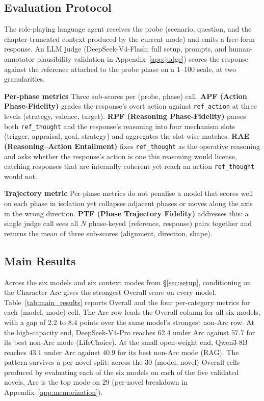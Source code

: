\documentclass[11pt]{article}
\begin{document}
\subsection{Evaluation Protocol\label{sec:evalproto}}

The role-playing language agent receives the probe (scenario, question, and the chapter-truncated context produced by the current mode) and emits a free-form response. An LLM judge (DeepSeek-V4-Flash; full setup, prompts, and human-annotator plausibility validation in Appendix~\ref{app:judge}) scores the response against the reference attached to the probe phase on a $1$--$100$ scale, at two granularities.

\textbf{Per-phase metrics}
Three sub-scores per (probe, phase) call. \textbf{APF (Action Phase-Fidelity)} grades the response's overt action against \texttt{ref\_action} at three levels (strategy, valence, target). \textbf{RPF (Reasoning Phase-Fidelity)} parses both \texttt{ref\_thought} and the response's reasoning into four mechanism slots (trigger, appraisal, goal, strategy) and aggregates the slot-wise matches. \textbf{RAE (Reasoning--Action Entailment)} fixes \texttt{ref\_thought} as the operative reasoning and asks whether the response's action is one this reasoning would license, catching responses that are internally coherent yet reach an action \texttt{ref\_thought} would not.

\textbf{Trajectory metric}
Per-phase metrics do not penalise a model that scores well on each phase in isolation yet collapses adjacent phases or moves along the axis in the wrong direction. \textbf{PTF (Phase Trajectory Fidelity)} addresses this: a single judge call sees all $N$ phase-keyed (reference, response) pairs together and returns the mean of three sub-scores (alignment, direction, shape).

\subsection{Main Results\label{sec:main}}

Across the six models and six context modes from \S\ref{sec:setup}, conditioning on the Character Arc gives the strongest Overall score on every model. Table~\ref{tab:main_results} reports Overall and the four per-category metrics for each (model, mode) cell. The Arc row leads the Overall column for all six models, with a gap of $2.2$ to $8.4$ points over the same model's strongest non-Arc row. At the high-capacity end, DeepSeek-V4-Pro reaches $62.4$ under Arc against $57.7$ for its best non-Arc mode (LifeChoice). At the small open-weight end, Qwen3-8B reaches $43.1$ under Arc against $40.9$ for its best non-Arc mode (RAG). The pattern survives a per-novel split: across the $30$ (model, novel) Overall cells produced by evaluating each of the six models on each of the five validated novels, Arc is the top mode on $29$ (per-novel breakdown in Appendix~\ref{app:memorization}).
\end{document}
